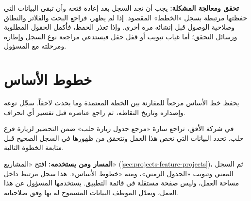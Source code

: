 \textbf{تحقق ومعالجة المشكلة:} يجب أن تجد السجل بعد إعادة فتحه وأن تبقى البيانات التي حفظتها مرتبطة بسجل «الخطط» المقصود. إذا لم يظهر، فراجع البحث والفلاتر والنطاق وصلاحية الوصول قبل إنشائه مرة أخرى. وإذا تعذر الحفظ، فأكمل الحقول المطلوبة ورسائل التحقق؛ أما غياب تبويب أو قفل حقل فيستدعي مراجعة نوع السجل وإطاره ومرحلته مع المسؤول.

\clearpage
\section{خطوط الأساس}
\label{sec:projects-feature-baselines}

يحفظ خط الأساس مرجعاً للمقارنة بين الخطة المعتمدة وما يحدث لاحقاً. سجّل نوعه وإصداره وتاريخ التقاطه، ثم راجع عناصره قبل تفسير أي انحراف.

\begin{rcnote}
في شركة الأفق، تراجع سارة «مرجع جدول زيارة حلب» ضمن التحضير لزيارة فرع حلب. تحدد البيانات التي تخص هذا العمل وتتحقق من ظهورها في السجل الصحيح قبل متابعة الخطوة التالية.
\end{rcnote}

\textbf{المسار ومن يستخدمه:} افتح «المشاريع» (\ref{sec:projects-feature-projects})، ثم السجل المعني وتبويب «الجدول الزمني»، ومنه «خطوط الأساس». هذا سجل مرتبط داخل مساحة العمل، وليس صفحة مستقلة في قائمة التطبيق. يستخدمها المسؤول عن هذا العمل، ويعدّل الموظف البيانات المسموح له بها وفق صلاحياته.

